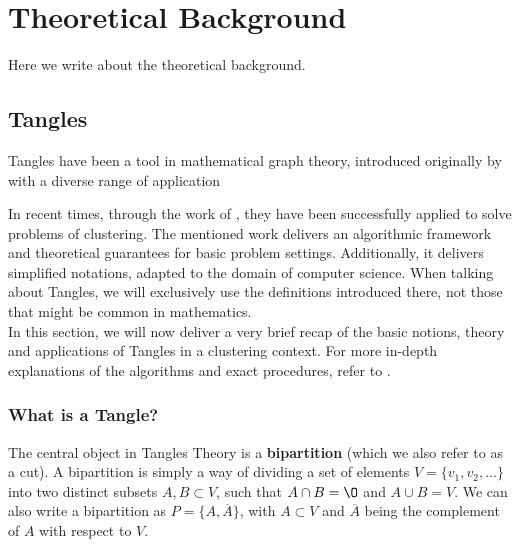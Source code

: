 \chapter{Theoretical Background}\label{theory}
Here we write about the theoretical background.

\section{Tangles}\label{theory:tangles}
Tangles have been a tool in mathematical graph theory, introduced originally by \cite{robertsonGraphMinorsObstructions1991} 
with a diverse range of application %

In recent times, through the work of \cite{klepperClusteringTanglesAlgorithmitc2020}, they have been successfully applied
to solve problems of clustering. The mentioned work delivers an algorithmic framework and theoretical guarantees for basic problem settings.
Additionally, it delivers simplified notations, adapted to the domain of computer science. When talking about Tangles,
we will exclusively use the definitions introduced there, not those that might be common in mathematics. \\

In this section, we will now deliver a very brief recap of the basic notions, theory and applications of Tangles in a clustering context.
For more in-depth explanations of the algorithms and exact procedures, refer to \cite{klepperClusteringTanglesAlgorithmic2020A}.
\subsection{What is a Tangle?}
The central object in Tangles Theory is a \textbf{bipartition} (which we also refer to as a cut). 
A bipartition is simply a way of dividing a set of elements $V =  \{ v_1, v_2, \ldots \}$ into two distinct subsets $A, B \subset V$, such that
$A \cap B = \O$ and $A \cup B = V$. We can also write a bipartition as $P = \{A, \overline{A}\}$, with $A \subset V$ and $\overline{A}$ being the
complement of $A$ with respect to $V$. \\

